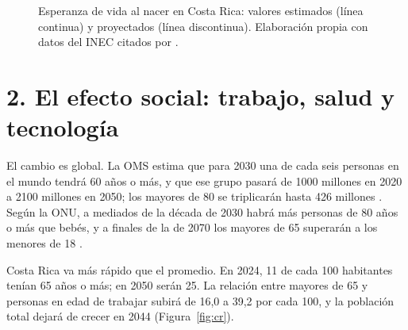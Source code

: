 \documentclass[11pt,letterpaper]{article}
\begin{document}
\begin{figure}[H]
\centering
{}
\caption{Esperanza de vida al nacer en Costa Rica: valores estimados (línea
continua) y proyectados (línea discontinua). Elaboración propia con datos del
INEC citados por \Textcite{ramirez2024}.}
\label{fig:esperanza}
\end{figure}

\section*{2. El efecto social: trabajo, salud y tecnología}

El cambio es global. La OMS estima que para 2030 una de cada seis personas en
el mundo tendrá 60 años o más, y que ese grupo pasará de 1000 millones en 2020
a 2100 millones en 2050; los mayores de 80 se triplicarán hasta 426 millones
\parencite{who2024}. Según la ONU, a mediados de la década de 2030 habrá más
personas de 80 años o más que bebés, y a finales de la de 2070 los mayores de
65 superarán a los menores de 18 \parencite{un2024}.

Costa Rica va más rápido que el promedio. En 2024, 11 de cada 100 habitantes
tenían 65 años o más; en 2050 serán 25. La relación entre mayores de 65 y
personas en edad de trabajar subirá de 16,0 a 39,2 por cada 100, y la población
total dejará de crecer en 2044 \parencite{ramirez2024} (Figura~\ref{fig:cr}).
\end{document}
